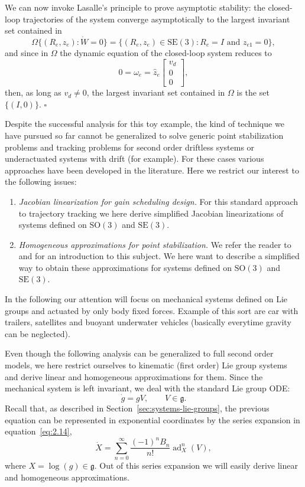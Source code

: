\documentclass[11pt]{article}
\newcommand{\SO}{\mathrm{SO}}
\newcommand{\SE}{\mathrm{SE}}
\newcommand{\gfrak}{\mathfrak g}
\newcommand{\ad}{\operatorname{ad}}
\newcommand{\proofbox}{\hfill$\square$}
\begin{document}
We can now invoke Lasalle's principle to prove asymptotic stability: the closed-loop trajectories of the system converge asymptotically to the largest invariant set contained in
\begin{equation*}
\Omega\{(R_e,z_e):\dot W=0\}=\{(R_e,z_e)\in\SE(3):R_e=I\text{ and }z_{e1}=0\},
\end{equation*}
and since in $\Omega$ the dynamic equation of the closed-loop system reduces to
\begin{equation*}
0=\omega_e=\widehat z_e\begin{bmatrix}v_d\\0\\0\end{bmatrix},
\end{equation*}
then, as long as $v_d\neq0$, the largest invariant set contained in $\Omega$ is the set $\{(I,0)\}$. \proofbox

Despite the successful analysis for this toy example, the kind of technique we have pursued so far cannot be generalized to solve generic point stabilization problems and tracking problems for second order driftless systems or underactuated systems with drift (for example). For these cases various approaches have been developed in the literature. Here we restrict our interest to the following issues:
\begin{enumerate}
\item \emph{Jacobian linearization for gain scheduling design.} For this standard approach to trajectory tracking we here derive simplified Jacobian linearizations of systems defined on $\SO(3)$ and $\SE(3)$.
\item \emph{Homogeneous approximations for point stabilization.} We refer the reader to \cite{24} and \cite{25} for an introduction to this subject. We here want to describe a simplified way to obtain these approximations for systems defined on $\SO(3)$ and $\SE(3)$.
\end{enumerate}
In the following our attention will focus on mechanical systems defined on Lie groups and actuated by only body fixed forces. Example of this sort are car with trailers, satellites and buoyant underwater vehicles (basically everytime gravity can be neglected).

Even though the following analysis can be generalized to full second order models, we here restrict ourselves to kinematic (first order) Lie group systems and derive linear and homogeneous approximations for them. Since the mechanical system is left invariant, we deal with the standard Lie group ODE:
\begin{equation*}
\dot g=gV,\qquad V\in\gfrak.\tag{6.5}\label{eq:6.5}
\end{equation*}
Recall that, as described in Section~\ref{sec:systems-lie-groups}, the previous equation can be represented in exponential coordinates by the series expansion in equation~\eqref{eq:2.14},
\begin{equation*}
\dot X=\sum_{n=0}^{\infty}\frac{(-1)^nB_n}{n!}\ad_X^n(V),\tag{6.6}\label{eq:6.6}
\end{equation*}
where $X=\log(g)\in\gfrak$. Out of this series expansion we will easily derive linear and homogeneous approximations.
\end{document}
